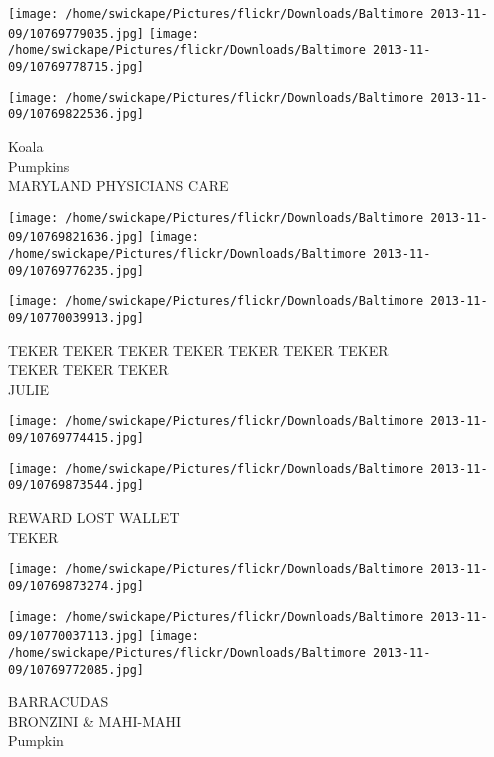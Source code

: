 \documentclass[10pt,letterpaper]{article}
\begin{document}
\texttt{[image: /home/swickape/Pictures/flickr/Downloads/Baltimore 2013-11-09/10769779035.jpg]}
\texttt{[image: /home/swickape/Pictures/flickr/Downloads/Baltimore 2013-11-09/10769778715.jpg]}

\vspace{0.25in}
\texttt{[image: /home/swickape/Pictures/flickr/Downloads/Baltimore 2013-11-09/10769822536.jpg]}

Koala\\
Pumpkins\\
MARYLAND PHYSICIANS CARE\\
\pagebreak

\texttt{[image: /home/swickape/Pictures/flickr/Downloads/Baltimore 2013-11-09/10769821636.jpg]}
\texttt{[image: /home/swickape/Pictures/flickr/Downloads/Baltimore 2013-11-09/10769776235.jpg]}

\vspace{0.25in}
\texttt{[image: /home/swickape/Pictures/flickr/Downloads/Baltimore 2013-11-09/10770039913.jpg]}

TEKER TEKER TEKER TEKER TEKER TEKER TEKER\\
TEKER TEKER TEKER\\
JULIE\\
\pagebreak

\texttt{[image: /home/swickape/Pictures/flickr/Downloads/Baltimore 2013-11-09/10769774415.jpg]}

\vspace{0.25in}
\texttt{[image: /home/swickape/Pictures/flickr/Downloads/Baltimore 2013-11-09/10769873544.jpg]}

REWARD LOST WALLET\\
TEKER\\
\pagebreak

\texttt{[image: /home/swickape/Pictures/flickr/Downloads/Baltimore 2013-11-09/10769873274.jpg]}

\vspace{0.25in}
\texttt{[image: /home/swickape/Pictures/flickr/Downloads/Baltimore 2013-11-09/10770037113.jpg]}
\texttt{[image: /home/swickape/Pictures/flickr/Downloads/Baltimore 2013-11-09/10769772085.jpg]}

BARRACUDAS\\
BRONZINI \& MAHI{-}MAHI\\
Pumpkin\\
\pagebreak
\end{document}
